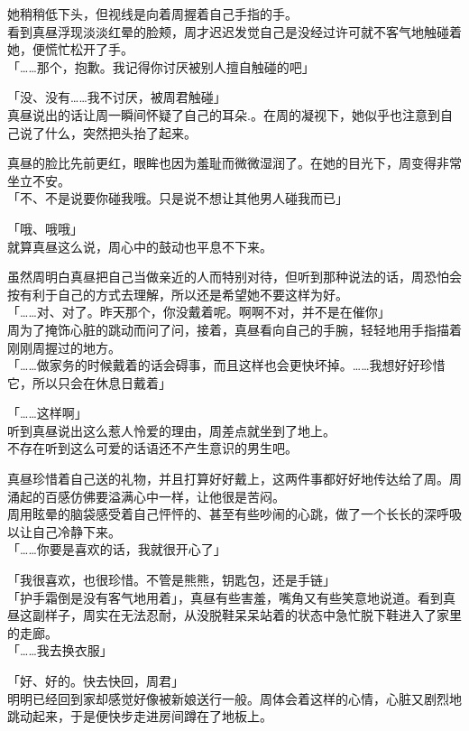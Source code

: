 她稍稍低下头，但视线是向着周握着自己手指的手。\\

看到真昼浮现淡淡红晕的脸颊，周才迟迟发觉自己是没经过许可就不客气地触碰着她，便慌忙松开了手。\\

「……那个，抱歉。我记得你讨厌被别人擅自触碰的吧」

「没、没有……我不讨厌，被周君触碰」\\

真昼说出的话让周一瞬间怀疑了自己的耳朵.。在周的凝视下，她似乎也注意到自己说了什么，突然把头抬了起来。

真昼的脸比先前更红，眼眸也因为羞耻而微微湿润了。在她的目光下，周变得非常坐立不安。\\

「不、不是说要你碰我哦。只是说不想让其他男人碰我而已」

「哦、哦哦」\\

就算真昼这么说，周心中的鼓动也平息不下来。

虽然周明白真昼把自己当做亲近的人而特别对待，但听到那种说法的话，周恐怕会按有利于自己的方式去理解，所以还是希望她不要这样为好。\\

「……对、对了。昨天那个，你没戴着呢。啊啊不对，并不是在催你」\\

周为了掩饰心脏的跳动而问了问，接着，真昼看向自己的手腕，轻轻地用手指描着刚刚周握过的地方。\\

「……做家务的时候戴着的话会碍事，而且这样也会更快坏掉。……我想好好珍惜它，所以只会在休息日戴着」

「……这样啊」\\

听到真昼说出这么惹人怜爱的理由，周差点就坐到了地上。\\

不存在听到这么可爱的话语还不产生意识的男生吧。

真昼珍惜着自己送的礼物，并且打算好好戴上，这两件事都好好地传达给了周。周涌起的百感仿佛要溢满心中一样，让他很是苦闷。\\

周用眩晕的脑袋感受着自己怦怦的、甚至有些吵闹的心跳，做了一个长长的深呼吸以让自己冷静下来。\\

「……你要是喜欢的话，我就很开心了」

「我很喜欢，也很珍惜。不管是熊熊，钥匙包，还是手链」\\

「护手霜倒是没有客气地用着」，真昼有些害羞，嘴角又有些笑意地说道。看到真昼这副样子，周实在无法忍耐，从没脱鞋呆呆站着的状态中急忙脱下鞋进入了家里的走廊。\\

「……我去换衣服」

「好、好的。快去快回，周君」\\

明明已经回到家却感觉好像被新娘送行一般。周体会着这样的心情，心脏又剧烈地跳动起来，于是便快步走进房间蹲在了地板上。

